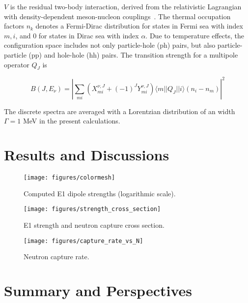 \documentclass[prc,twocolumn,twoside,showpacs,superscriptaddress,floatfix]{revtex4-1}
\begin{document}
$V$ is the residual two-body interaction, derived from the relativistic
Lagrangian with  density-dependent meson-nucleon couplings~\cite{Niksic}.
The
thermal occupation factors $n_k$ denotes a Fermi-Dirac distribution for states
in Fermi sea with index $m,i$, and $0$ for states in Dirac sea with index
$\alpha$.
Due to temperature effects, the configuration space includes not only
particle-hole (ph) pairs, but also particle-particle (pp) and hole-hole (hh)
pairs.
The transition strength for a multipole operator $Q_J$ is

\begin{equation}
   B(J,E_\nu) = \left | \sum_{mi} (X^{\nu,J}_{mi} +
   (-1)^J Y^{\nu,J}_{mi} ) \langle m || Q_J || i\rangle (n_i
   -n_m) \right |^2
\end{equation}

The discrete spectra are averaged with a Lorentzian distribution of an width
$\Gamma = 1 $ MeV in the present calculations.




\section{Results and Discussions}\label{sec:results}


\begin{figure}[htp]
\centering
\texttt{[image: figures/colormesh]}
\caption{\label{fig:e1}Computed E1 dipole strengths (logarithmic scale).}
\end{figure}

\begin{figure}[htp]
\centering
\texttt{[image: figures/strength\_cross\_section]}
\caption{\label{fig:e1_xsec}E1 strength and neutron capture cross section.}
\end{figure}

\begin{figure}[htp]
\centering
\texttt{[image: figures/capture\_rate\_vs\_N]}
\caption{\label{fig:neutron_capture}Neutron capture rate.}
\end{figure}

\section{Summary and Perspectives}\label{sec:summary}
\end{document}
